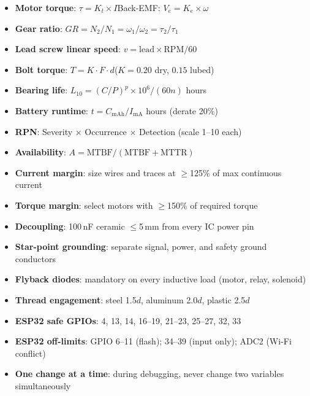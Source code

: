 \documentclass[11pt,letterpaper]{article}
\begin{document}
\begin{checklistbox}
\begin{itemize}[leftmargin=*, itemsep=2pt, topsep=0pt]
    \item \textbf{Motor torque}: $\tau = K_t \times I$\quad Back-EMF: $V_e = K_e \times \omega$
    \item \textbf{Gear ratio}: $GR = N_2/N_1 = \omega_1/\omega_2 = \tau_2/\tau_1$
    \item \textbf{Lead screw linear speed}: $v = \text{lead} \times \text{RPM} / 60$
    \item \textbf{Bolt torque}: $T = K \cdot F \cdot d$\quad ($K=0.20$ dry, $0.15$ lubed)
    \item \textbf{Bearing life}: $L_{10} = (C/P)^p \times 10^6 / (60n)$ hours
    \item \textbf{Battery runtime}: $t = C_{\text{mAh}} / I_{\text{mA}}$ hours (derate 20\%)
    \item \textbf{RPN}: Severity $\times$ Occurrence $\times$ Detection (scale 1--10 each)
    \item \textbf{Availability}: $A = \text{MTBF} / (\text{MTBF} + \text{MTTR})$
\end{itemize}
\end{checklistbox}

\begin{checklistbox}
\begin{itemize}[leftmargin=*, itemsep=2pt, topsep=0pt]
    \item \textbf{Current margin}: size wires and traces at $\geq$125\% of max continuous current
    \item \textbf{Torque margin}: select motors with $\geq$150\% of required torque
    \item \textbf{Decoupling}: 100\,nF ceramic $\leq$5\,mm from every IC power pin
    \item \textbf{Star-point grounding}: separate signal, power, and safety ground conductors
    \item \textbf{Flyback diodes}: mandatory on every inductive load (motor, relay, solenoid)
    \item \textbf{Thread engagement}: steel 1.5$d$, aluminum 2.0$d$, plastic 2.5$d$
    \item \textbf{ESP32 safe GPIOs}: 4, 13, 14, 16--19, 21--23, 25--27, 32, 33
    \item \textbf{ESP32 off-limits}: GPIO 6--11 (flash); 34--39 (input only); ADC2 (Wi-Fi conflict)
    \item \textbf{One change at a time}: during debugging, never change two variables simultaneously
\end{itemize}
\end{checklistbox}
\end{document}
